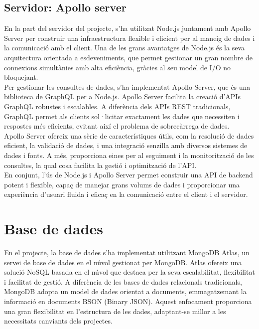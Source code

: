 \documentclass[a4paper,12pt,twoside]{ThesisStyle}
\begin{document}
\subsection{Servidor: Apollo server}
\label{subsec:Servidor: Apollo server}

En la part del servidor del projecte, s'ha utilitzat Node.js juntament amb Apollo Server per construir una infraestructura flexible i eficient per al maneig de dades i la comunicació amb el client. Una de les grans avantatges de Node.js és la seva arquitectura orientada a esdeveniments, que permet gestionar un gran nombre de connexions simultànies amb alta eficiència, gràcies al seu model de I/O no bloquejant.\\

Per gestionar les consultes de dades, s'ha implementat Apollo Server, que és una biblioteca de GraphQL per a Node.js. Apollo Server facilita la creació d'APIs GraphQL robustes i escalables. A diferència dels APIs REST tradicionals, GraphQL permet als clients sol·licitar exactament les dades que necessiten i respostes més eficients, evitant així el problema de sobrecàrrega de dades.\\

Apollo Server ofereix una sèrie de característiques útils, com la resolució de dades eficient, la validació de dades, i una integració senzilla amb diversos sistemes de dades i fonts. A més, proporciona eines per al seguiment i la monitorització de les consultes, la qual cosa facilita la gestió i optimització de l'API.\\

En conjunt, l'ús de Node.js i Apollo Server permet construir una API de backend potent i flexible, capaç de manejar grans volums de dades i proporcionar una experiència d'usuari fluida i eficaç en la comunicació entre el client i el servidor.



\section{Base de dades}
\label{subsec: Base de dades}


En el projecte, la base de dades s'ha implementat utilitzant MongoDB Atlas, un servei de base de dades en el núvol gestionat per MongoDB. Atlas ofereix una solució NoSQL basada en el núvol que destaca per la seva escalabilitat, flexibilitat i facilitat de gestió. A diferència de les bases de dades relacionals tradicionals, MongoDB adopta un model de dades orientat a documents, emmagatzemant la informació en documents BSON (Binary JSON). Aquest enfocament proporciona una gran flexibilitat en l'estructura de les dades, adaptant-se millor a les necessitats canviants dels projectes.\\
\end{document}
